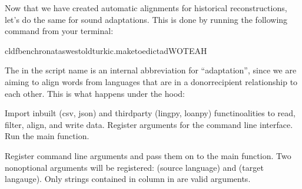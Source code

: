 \documentclass[letterpaper,10pt,english]{sphinxmanual}
\begin{document}
{{{{\begin{fulllineitems}
\end{fulllineitems}


\sphinxAtStartPar
Now that we have created automatic alignments for historical reconstructions,
let’s do the same for sound adaptations. This is done by running the following
command from your terminal:

\begin{sphinxVerbatim}[commandchars=\\\{\}]
cldfbenchronataswestoldturkic.maketoedict\PYGZus{}adWOTEAH
\end{sphinxVerbatim}

\sphinxAtStartPar
The  in the script name is an internal abbreviation for “adaptation”,
since we are aiming
to align words from languages that are in a donor\sphinxhyphen{}recipient relationship to
each other. This is what happens under the hood:

\label{\detokenize{mkedictor:module-ronataswestoldturkiccommands.maketoedict_ad}}
\sphinxAtStartPar
Import inbuilt (csv, json) and third\sphinxhyphen{}party (lingpy, loanpy) functinoalities to
read, filter, align, and write data.
Register arguments for the command line interface. Run the main function.

\begin{fulllineitems}
\label{\detokenize{mkedictor:ronataswestoldturkiccommands.maketoedict_ad.register}}
\pysigstartsignatures
{}
\pysigstopsignatures
\sphinxAtStartPar
Register command line arguments and pass them on to the main function.
Two non\sphinxhyphen{}optional arguments will be registered:
 (source language) and  (target langauge).
Only strings contained in column  in  are valid
arguments.

\end{fulllineitems}

}}}}
\end{document}

